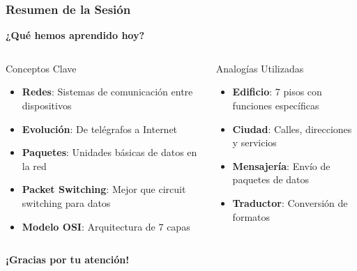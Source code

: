 \documentclass[aspectratio=169]{beamer}
\begin{document}
              \begin{frame}
              \frametitle{Resumen de la Sesión}
              
              \begin{center}
              \Large \textbf{¿Qué hemos aprendido hoy?}
              \end{center}
              
              \begin{columns}
              \begin{block}{Conceptos Clave}
              \begin{itemize}
              \item \textbf{Redes}: Sistemas de comunicación entre dispositivos
              \item \textbf{Evolución}: De telégrafos a Internet
              \item \textbf{Paquetes}: Unidades básicas de datos en la red
              \item \textbf{Packet Switching}: Mejor que circuit switching para datos
              \item \textbf{Modelo OSI}: Arquitectura de 7 capas
              \end{itemize}
              \end{block}
              
              \begin{block}{Analogías Utilizadas}
              \begin{itemize}
              \item \textbf{Edificio}: 7 pisos con funciones específicas
              \item \textbf{Ciudad}: Calles, direcciones y servicios
              \item \textbf{Mensajería}: Envío de paquetes de datos
              \item \textbf{Traductor}: Conversión de formatos
              \end{itemize}
              \end{block}
              \end{columns}
  
              \begin{center}
              \Large \textbf{¡Gracias por tu atención!}
              \end{center}
              \end{frame}
      
\end{document}
